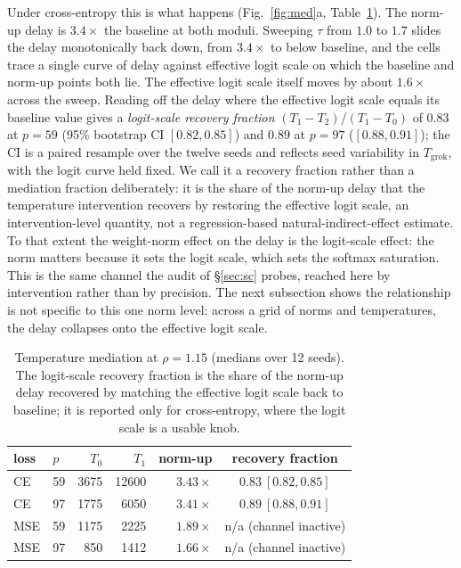 Under cross-entropy this is what happens (Fig.~\ref{fig:med}a, Table~\ref{tab:main}). The norm-up delay is
$3.4\times$ the baseline at both moduli. Sweeping $\tau$ from $1.0$ to $1.7$ slides the delay monotonically
back down, from $3.4\times$ to below baseline, and the cells trace a single curve of delay against
effective logit scale on which the baseline and norm-up points both lie. The effective logit scale itself
moves by about $1.6\times$ across the sweep. Reading off the delay where the effective logit scale equals
its baseline value gives a \emph{logit-scale recovery fraction} $(T_1-T_2)/(T_1-T_0)$ of $0.83$ at $p=59$
(95\% bootstrap CI $[0.82,0.85]$) and $0.89$ at $p=97$ ($[0.88,0.91]$); the CI is a paired resample over
the twelve seeds and reflects seed variability in $T_{\mathrm{grok}}$, with the logit curve held fixed. We
call it a recovery fraction rather than a mediation fraction deliberately: it is the share of the norm-up
delay that the temperature intervention recovers by restoring the effective logit scale, an
intervention-level quantity, not a regression-based natural-indirect-effect estimate. To that extent the
weight-norm effect on the delay is the logit-scale effect: the norm matters because it sets the logit
scale, which sets the softmax saturation. This is the same channel the audit of \S\ref{sec:sc} probes,
reached here by intervention rather than by precision. The next subsection shows the relationship is not
specific to this one norm level: across a grid of norms and temperatures, the delay collapses onto the
effective logit scale.

\begin{table}[h]\centering\small
\caption{Temperature mediation at $\rho=1.15$ (medians over 12 seeds). The logit-scale recovery fraction is
the share of the norm-up delay recovered by matching the effective logit scale back to baseline; it is
reported only for cross-entropy, where the logit scale is a usable knob.}
\label{tab:main}
\begin{tabular}{llrrrc}
\toprule
loss & $p$ & $T_0$ & $T_1$ & norm-up & recovery fraction \\
\midrule
CE  & 59 & 3675 & 12600 & $3.43\times$ & $0.83\ [0.82,0.85]$ \\
CE  & 97 & 1775 & 6050  & $3.41\times$ & $0.89\ [0.88,0.91]$ \\
MSE & 59 & 1175 & 2225  & $1.89\times$ & n/a (channel inactive) \\
MSE & 97 & 850  & 1412  & $1.66\times$ & n/a (channel inactive) \\
\bottomrule
\end{tabular}
\end{table}

